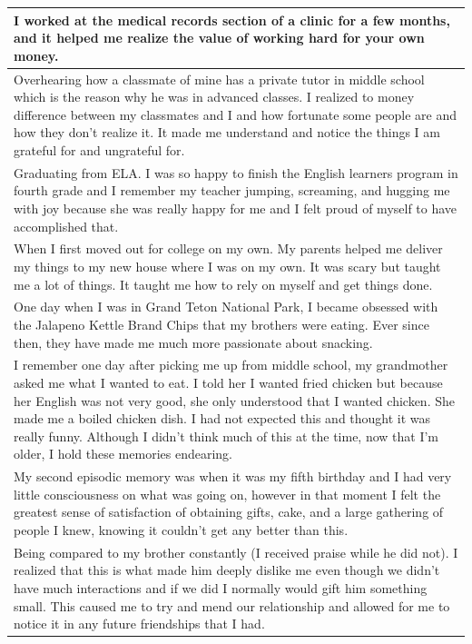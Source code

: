 \documentclass[
  .7em,
  letterpaper,
  DIV=11,
  numbers=noendperiod]{scrartcl}
\begin{document}
\begin{table}
\begin{tabular}{l}
\hline
I worked at the medical records section of a clinic for a few months, and it helped me realize the value of working hard for your own money.\\
\hline
Overhearing how a classmate of mine has a private tutor in middle school which is the reason why he was in advanced classes. I realized to money difference between my classmates and I and how fortunate some people are and how they don't realize it. It made me understand and notice the things I am grateful for and ungrateful for.\\
\hline
Graduating from ELA. I was so happy to finish the English learners program in fourth grade and I remember my teacher jumping, screaming, and hugging me with joy because she was really happy for me and I felt proud of myself to have accomplished that.\\
\hline
When I first moved out for college on my own. My parents helped me deliver my things to my new house where I was on my own. It was scary but taught me a lot of things. It taught me how to rely on myself and get things done.\\
\hline
One day when I was in Grand Teton National Park, I became obsessed with the Jalapeno Kettle Brand Chips that my brothers were eating. Ever since then, they have made me much more passionate about snacking.\\
\hline
I remember one day after picking me up from middle school, my grandmother asked me what I wanted to eat. I told her I wanted fried chicken but because her English was not very good, she only understood that I wanted chicken. She made me a boiled chicken dish. I had not expected this and thought it was really funny. Although I didn’t think much of this at the time, now that I’m older, I hold these memories endearing.\\
\hline
My second episodic memory was when it was my fifth birthday and I had very little consciousness on what was going on, however in that moment I felt the greatest sense of satisfaction of obtaining gifts, cake, and a large gathering of people I knew, knowing it couldn't get any better than this.\\
\hline
Being compared to my brother constantly (I received praise while he did not). I realized that this is what made him deeply dislike me even though we didn't have much interactions and if we did I normally would gift him something small. This caused me to try and mend our relationship and allowed for me to notice it in any future friendships that I had.\\

\end{tabular}
\end{table}
\end{document}
